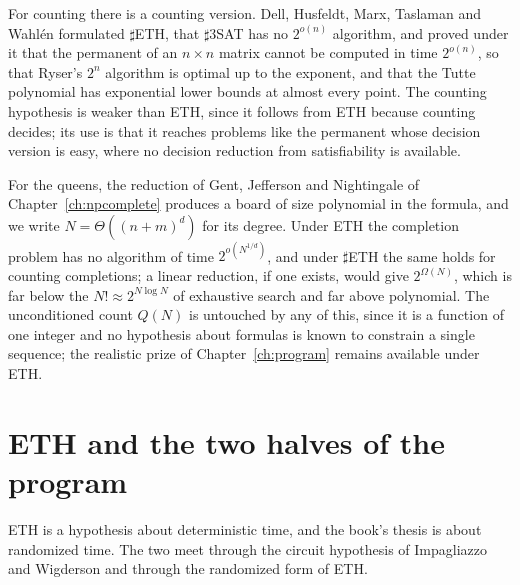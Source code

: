For counting there is a counting version. Dell, Husfeldt, Marx, Taslaman and Wahl\'en \cite{DHMTW} formulated $\sharp$ETH, that $\sharp 3$SAT has no $2^{o(n)}$ algorithm, and proved under it that the permanent of an $n \times n$ matrix cannot be computed in time $2^{o(n)}$, so that Ryser's $2^n$ algorithm is optimal up to the exponent, and that the Tutte polynomial has exponential lower bounds at almost every point. The counting hypothesis is weaker than ETH, since it follows from ETH because counting decides; its use is that it reaches problems like the permanent whose decision version is easy, where no decision reduction from satisfiability is available.

For the queens, the reduction of Gent, Jefferson and Nightingale of Chapter~\ref{ch:npcomplete} produces a board of size polynomial in the formula, and we write $N = \Theta((n + m)^d)$ for its degree. Under ETH the completion problem has no algorithm of time $2^{o(N^{1/d})}$, and under $\sharp$ETH the same holds for counting completions; a linear reduction, if one exists, would give $2^{\Omega(N)}$, which is far below the $N! \approx 2^{N \log N}$ of exhaustive search and far above polynomial. The unconditioned count $Q(N)$ is untouched by any of this, since it is a function of one integer and no hypothesis about formulas is known to constrain a single sequence; the realistic prize of Chapter~\ref{ch:program} remains available under ETH.

\section{ETH and the two halves of the program}

ETH is a hypothesis about deterministic time, and the book's thesis is about randomized time. The two meet through the circuit hypothesis of Impagliazzo and Wigderson \cite{IW} and through the randomized form of ETH.

